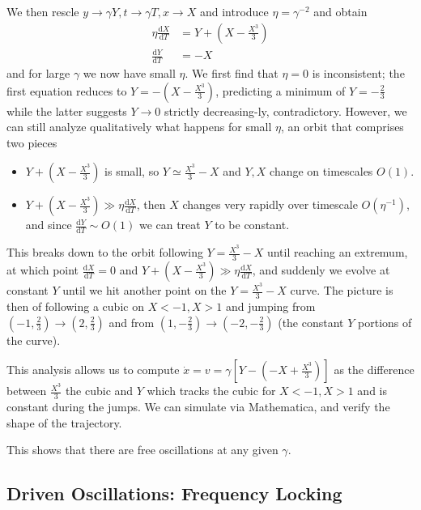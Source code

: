 \documentclass[12pt]{article}
\newcommand{\rd}[2]{\frac{\mathrm{d}#1}{\mathrm{d}#2}}
\begin{document}
We then rescle $y \to \gamma Y, t \to \gamma T, x \to X$ and introduce $\eta =
\gamma^{-2}$ and obtain
\begin{align}
    \eta \rd{X}{T} &= Y + \left( X - \frac{X^3}{3} \right)\\
    \rd{Y}{T} &= -X
\end{align}
and for large $\gamma$ we now have small $\eta$. We first find that $\eta = 0$
is inconsistent; the first equation reduces to $Y = -\left( X - \frac{X^3}{3}
\right)$, predicting a minimum of $Y = -\frac{2}{3}$ while the latter suggests
$Y \to 0$ strictly decreasing-ly, contradictory. However, we can still analyze
qualitatively what happens for small $\eta$, an orbit that comprises two pieces
\begin{itemize}
    \item $Y + \left( X - \frac{X^3}{3} \right)$ is small, so $Y \simeq
        \frac{X^3}{3} - X$ and $Y, X$ change on timescales $O(1)$.
    \item $Y + \left( X - \frac{X^3}{3} \right) \gg \eta\rd{X}{T}$, then $X$
        changes very rapidly over timescale $O(\eta^{-1})$, and since $\rd{Y}{T}
        \sim O(1)$ we can treat $Y$ to be constant.
\end{itemize}

This breaks down to the orbit following $Y = \frac{X^3}{3} - X$ until reaching
an extremum, at which point $\rd{X}{T} = 0$ and $Y + \left( X - \frac{X^3}{3}
\right) \gg \eta \rd{X}{T}$, and suddenly we evolve at constant $Y$ until we hit
another point on the $Y = \frac{X^3}{3} - X$ curve. The picture is then of
following a cubic on $X < -1, X > 1$ and jumping from $\left(-1,
\frac{2}{3}\right) \to \left( 2, \frac{2}{3} \right)$ and from $\left( 1,
-\frac{2}{3} \right)\to \left( -2, -\frac{2}{3} \right)$ (the constant $Y$
portions of the curve).

This analysis allows us to compute $\dot{x} = v = \gamma\left[ Y - \left( -X +
\frac{X^3}{3} \right) \right]$ as the difference between $\frac{X^3}{3}$ the
cubic and $Y$ which tracks the cubic for $X < -1, X > 1$ and is constant during
the jumps. We can simulate via Mathematica, and verify the shape of the
trajectory.

This shows that there are free oscillations at any given $\gamma$.

\subsection{Driven Oscillations: Frequency Locking}
\end{document}
